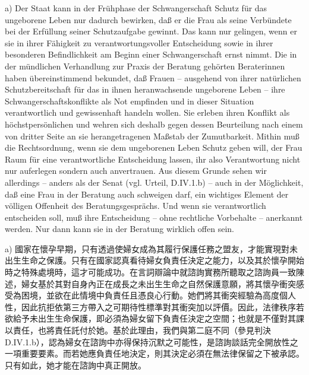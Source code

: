 \documentclass[12pt]{article}
\begin{document}
\begin{sourcepara}[title={原文SondervotumMS.294}]
a) Der Staat kann in der Frühphase der Schwangerschaft Schutz für das ungeborene Leben nur dadurch bewirken, daß er die Frau als seine Verbündete bei der Erfüllung seiner Schutzaufgabe gewinnt. Das kann nur gelingen, wenn er sie in ihrer Fähigkeit zu verantwortungsvoller Entscheidung sowie in ihrer besonderen Befindlichkeit am Beginn einer Schwangerschaft ernst nimmt. Die in der mündlichen Verhandlung zur Praxis der Beratung gehörten Beraterinnen haben übereinstimmend bekundet, daß Frauen -- ausgehend von ihrer natürlichen Schutzbereitschaft für das in ihnen heranwachsende ungeborene Leben -- ihre Schwangerschaftskonflikte als Not empfinden und in dieser Situation verantwortlich und gewissenhaft handeln wollen. Sie erleben ihren Konflikt als höchstpersönlichen und wehren sich deshalb gegen dessen Beurteilung nach einem von dritter Seite an sie herangetragenen Maßstab der Zumutbarkeit. Mithin muß die Rechtsordnung, wenn sie dem ungeborenen Leben Schutz geben will, der Frau Raum für eine verantwortliche Entscheidung lassen, ihr also Verantwortung nicht nur auferlegen sondern auch anvertrauen. Aus diesem Grunde sehen wir allerdings -- anders als der Senat (vgl. Urteil, D.IV.1.b) -- auch in der Möglichkeit, daß eine Frau in der Beratung auch schweigen darf, ein wichtiges Element der völligen Offenheit des Beratungsgesprächs. Und wenn sie verantwortlich entscheiden soll, muß ihre Entscheidung -- ohne rechtliche Vorbehalte -- anerkannt werden. Nur dann kann sie in der Beratung wirklich offen sein.
\end{sourcepara}
\begin{transpara}
a) 國家在懷孕早期，只有透過使婦女成為其履行保護任務之盟友，才能實現對未出生生命之保護。只有在國家認真看待婦女負責任決定之能力，以及其於懷孕開始時之特殊處境時，這才可能成功。在言詞辯論中就諮詢實務所聽取之諮詢員一致陳述，婦女基於其對自身內正在成長之未出生生命之自然保護意願，將其懷孕衝突感受為困境，並欲在此情境中負責任且憑良心行動。她們將其衝突經驗為高度個人性，因此抗拒依第三方帶入之可期待性標準對其衝突加以評價。因此，法律秩序若欲給予未出生生命保護，即必須為婦女留下負責任決定之空間；也就是不僅對其課以責任，也將責任託付於她。基於此理由，我們與第二庭不同（參見判決 D.IV.1.b），認為婦女在諮詢中亦得保持沉默之可能性，是諮詢談話完全開放性之一項重要要素。而若她應負責任地決定，則其決定必須在無法律保留之下被承認。只有如此，她才能在諮詢中真正開放。
\end{transpara}
\end{document}
